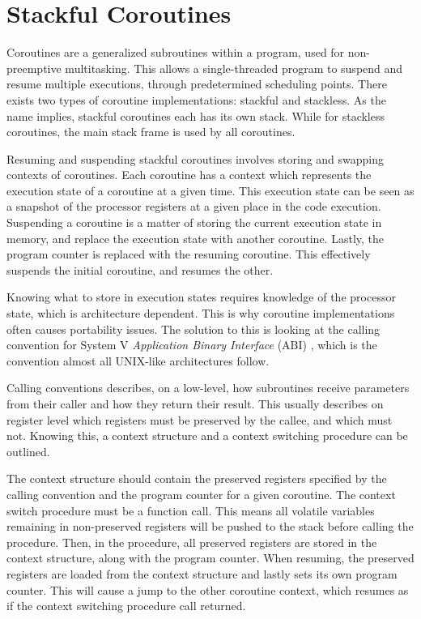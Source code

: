 \FloatBarrier


\section{Stackful Coroutines}
\label{sec:stackful_coroutines}

Coroutines are a generalized subroutines within a program, used for non-preemptive multitasking. This allows a single\hyp{}threaded program to suspend and resume multiple executions, through predetermined scheduling points. There exists two types of coroutine implementations: stackful and stackless. As the name implies, stackful coroutines each has its own stack. While for stackless coroutines, the main stack frame is used by all coroutines.

Resuming and suspending stackful coroutines involves storing and swapping contexts of coroutines. Each coroutine has a context which represents the execution state of a coroutine at a given time. This execution state can be seen as a snapshot of the processor registers at a given place in the code execution. Suspending a coroutine is a matter of storing the current execution state in memory, and replace the execution state with another coroutine. Lastly, the program counter is replaced with the resuming coroutine. This effectively suspends the initial coroutine, and resumes the other. 

Knowing what to store in execution states requires knowledge of the processor state, which is architecture dependent. This is why coroutine implementations often causes portability issues. The solution to this is looking at the calling convention for System V \textit{Application Binary Interface} (ABI) \citep{systemvabi}, which is the convention almost all UNIX\hyp{}like architectures follow. 

Calling conventions describes, on a low\hyp{}level, how subroutines receive parameters from their caller and how they return their result. This usually describes on register level which registers must be preserved by the callee, and which must not. Knowing this, a context structure and a context switching procedure can be outlined. 

The context structure should contain the preserved registers specified by the calling convention and the program counter for a given coroutine. The context switch procedure must be a function call. This means all volatile variables remaining in non\hyp{}preserved registers will be pushed to the stack before calling the procedure. Then, in the procedure, all preserved registers are stored in the context structure, along with the program counter. When resuming, the preserved registers are loaded from the context structure and lastly sets its own program counter. This will cause a jump to the other coroutine context, which resumes as if the context switching procedure call returned. 


